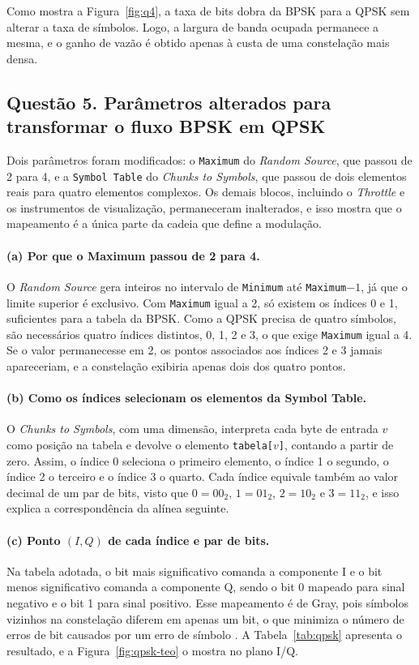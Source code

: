Como mostra a Figura~\ref{fig:q4}, a taxa de bits dobra da BPSK para a QPSK sem alterar a taxa de símbolos. Logo, a largura de banda ocupada permanece a mesma, e o ganho de vazão é obtido apenas à custa de uma constelação mais densa.

\subsection*{Questão 5. Parâmetros alterados para transformar o fluxo BPSK em QPSK}

Dois parâmetros foram modificados: o \texttt{Maximum} do \textit{Random Source}, que passou de 2 para 4, e a \texttt{Symbol Table} do \textit{Chunks to Symbols}, que passou de dois elementos reais para quatro elementos complexos. Os demais blocos, incluindo o \textit{Throttle} e os instrumentos de visualização, permaneceram inalterados, e isso mostra que o mapeamento é a única parte da cadeia que define a modulação.

\paragraph{(a) Por que o Maximum passou de 2 para 4.} O \textit{Random Source} gera inteiros no intervalo de \texttt{Minimum} até \texttt{Maximum}$-1$, já que o limite superior é exclusivo. Com \texttt{Maximum} igual a 2, só existem os índices 0 e 1, suficientes para a tabela da BPSK. Como a QPSK precisa de quatro símbolos, são necessários quatro índices distintos, 0, 1, 2 e 3, o que exige \texttt{Maximum} igual a 4. Se o valor permanecesse em 2, os pontos associados aos índices 2 e 3 jamais apareceriam, e a constelação exibiria apenas dois dos quatro pontos.

\paragraph{(b) Como os índices selecionam os elementos da Symbol Table.} O \textit{Chunks to Symbols}, com uma dimensão, interpreta cada byte de entrada $v$ como posição na tabela e devolve o elemento \texttt{tabela[}$v$\texttt{]}, contando a partir de zero. Assim, o índice 0 seleciona o primeiro elemento, o índice 1 o segundo, o índice 2 o terceiro e o índice 3 o quarto. Cada índice equivale também ao valor decimal de um par de bits, visto que $0=00_2$, $1=01_2$, $2=10_2$ e $3=11_2$, e isso explica a correspondência da alínea seguinte.

\paragraph{(c) Ponto $(I,Q)$ de cada índice e par de bits.} Na tabela adotada, o bit mais significativo comanda a componente I e o bit menos significativo comanda a componente Q, sendo o bit 0 mapeado para sinal negativo e o bit 1 para sinal positivo. Esse mapeamento é de Gray, pois símbolos vizinhos na constelação diferem em apenas um bit, o que minimiza o número de erros de bit causados por um erro de símbolo \cite{proakis2008}. A Tabela~\ref{tab:qpsk} apresenta o resultado, e a Figura~\ref{fig:qpsk-teo} o mostra no plano I/Q.

